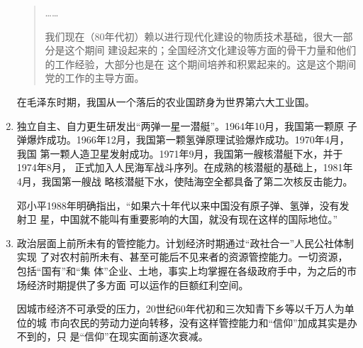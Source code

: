 \begin{enumerate}
\begin{quotation}
    ……

    我们现在（80年代初）赖以进行现代化建设的物质技术基础，很大一部分是这个期间
    建设起来的；全国经济文化建设等方面的骨干力量和他们的工作经验，大部分也是在
    这个期间培养和积累起来的。这是这个期间党的工作的主导方面。
  \end{quotation}
  在毛泽东时期，我国从一个落后的农业国跻身为世界第六大工业国。

\item 独立自主、自力更生研发出“两弹一星一潜艇”。1964年10月，我国第一颗原
  子弹爆炸成功。1966年12月，我国第一颗氢弹原理试验爆炸成功。1970年4月，我国
  第一颗人造卫星发射成功。1971年9月，我国第一艘核潜艇下水，并于1974年8月，
  正式加入人民海军战斗序列。在成熟的核潜艇的基础上，1981年4月，我国第一艘战
  略核潜艇下水，使陆海空全都具备了第二次核反击能力。

  邓小平1988年明确指出，“如果六十年代以来中国没有原子弹、氢弹，没有发射卫
  星，中国就不能叫有重要影响的大国，就没有现在这样的国际地位。”



\item 政治层面上前所未有的管控能力。计划经济时期通过“政社合一”人民公社体制实现
  了对农村前所未有、甚至可能后不见来者的资源管控能力。一切资源，包括“国有”和“集
  体”企业、土地，事实上均掌握在各级政府手中，为之后的市场经济时期提供了多方面
  可以运作的巨额红利空间。

  因城市经济不可承受的压力，20世纪60年代初和三次知青下乡等以千万人为单位的城
  市向农民的劳动力逆向转移，没有这样管控能力和“信仰”加成其实是办不到的，只
  是“信仰”在现实面前逐次衰减。
\end{enumerate}
